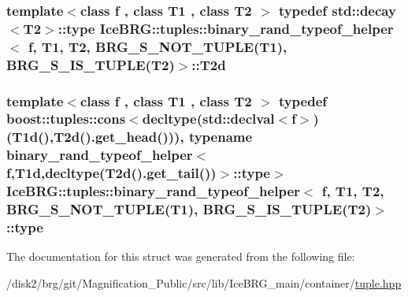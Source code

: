 \subsubsection[{T2d}]{\setlength{\rightskip}{0pt plus 5cm}template$<$class f , class T1 , class T2 $>$ typedef std\+::decay$<$T2$>$\+::{\bf type} {\bf Ice\+B\+R\+G\+::tuples\+::binary\+\_\+rand\+\_\+typeof\+\_\+helper}$<$ f, T1, T2, {\bf B\+R\+G\+\_\+\+S\+\_\+\+N\+O\+T\+\_\+\+T\+U\+P\+L\+E}(T1), {\bf B\+R\+G\+\_\+\+S\+\_\+\+I\+S\+\_\+\+T\+U\+P\+L\+E}(T2)$>$\+::{\bf T2d}}\label{structIceBRG_1_1tuples_1_1binary__rand__typeof__helper_3_01f_00_01T1_00_01T2_00_01BRG__S__NOT__Taf66ad01f9236805ac3540fbfcbdbe8d_a3a164206134c4a96b7580904a5e0d8f4}
\hypertarget{structIceBRG_1_1tuples_1_1binary__rand__typeof__helper_3_01f_00_01T1_00_01T2_00_01BRG__S__NOT__Taf66ad01f9236805ac3540fbfcbdbe8d_a16ebb24bf69cdcfb4eee44b77e3abe71}{}
\subsubsection[{type}]{\setlength{\rightskip}{0pt plus 5cm}template$<$class f , class T1 , class T2 $>$ typedef boost\+::tuples\+::cons$<$decltype(std\+::declval$<$f$>$)({\bf T1d}(),{\bf T2d}().get\+\_\+head())), typename {\bf binary\+\_\+rand\+\_\+typeof\+\_\+helper}$<$f,{\bf T1d},decltype({\bf T2d}().get\+\_\+tail())$>$\+::{\bf type}$>$ {\bf Ice\+B\+R\+G\+::tuples\+::binary\+\_\+rand\+\_\+typeof\+\_\+helper}$<$ f, T1, T2, {\bf B\+R\+G\+\_\+\+S\+\_\+\+N\+O\+T\+\_\+\+T\+U\+P\+L\+E}(T1), {\bf B\+R\+G\+\_\+\+S\+\_\+\+I\+S\+\_\+\+T\+U\+P\+L\+E}(T2)$>$\+::{\bf type}}\label{structIceBRG_1_1tuples_1_1binary__rand__typeof__helper_3_01f_00_01T1_00_01T2_00_01BRG__S__NOT__Taf66ad01f9236805ac3540fbfcbdbe8d_a16ebb24bf69cdcfb4eee44b77e3abe71}


The documentation for this struct was generated from the following file\+:\begin{DoxyCompactItemize}
\item 
/disk2/brg/git/\+Magnification\+\_\+\+Public/src/lib/\+Ice\+B\+R\+G\+\_\+main/container/\hyperlink{tuple_8hpp}{tuple.\+hpp}\end{DoxyCompactItemize}
